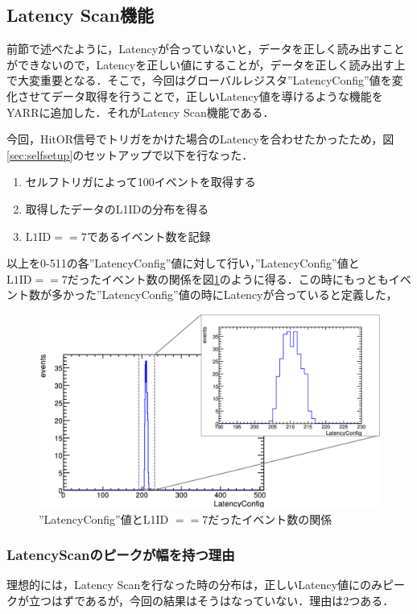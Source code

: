 \subsection{Latency Scan機能}
前節で述べたように，Latencyが合っていないと，データを正しく読み出すことができないので，Latencyを正しい値にすることが，データを正しく読み出す上で大変重要となる．そこで，今回はグローバルレジスタ''LatencyConfig''値を変化させてデータ取得を行うことで，正しいLatency値を導けるような機能をYARRに追加した．それがLatency Scan機能である．\par
今回，HitOR信号でトリガをかけた場合のLatencyを合わせたかったため，図\ref{sec:selfsetup}のセットアップで以下を行なった．
\begin{enumerate}
\item セルフトリガによって100イベントを取得する
\item 取得したデータのL1IDの分布を得る
\item $\mathrm{L1ID} == 7$であるイベント数を記録
\end{enumerate}
以上を0-511の各''LatencyConfig''値に対して行い，''LatencyConfig''値と$\mathrm{L1ID} == 7$だったイベント数の関係を図\ref{fig:latencydist}のように得る．この時にもっともイベント数が多かった''LatencyConfig''値の時にLatencyが合っていると定義した，

\begin{figure}[h]
  \centering
  \includegraphics[width=13cm]{./figure/latencydist.png}
  \caption{''LatencyConfig''値とL1ID $== 7$だったイベント数の関係}
  \label{fig:latencydist}
\end{figure}


\subsubsection*{LatencyScanのピークが幅を持つ理由}
理想的には，Latency Scanを行なった時の分布は，正しいLatency値にのみピークが立つはずであるが，今回の結果はそうはなっていない．理由は2つある．

